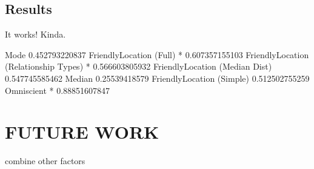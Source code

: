 \documentclass{sig-alternate}
\begin{document}
\subsection{Results}
\begin{figure}
\centering
{}
\caption{
}
\label{fig:FinalResults}
\end{figure}

It works! Kinda.

Mode 0.452793220837
FriendlyLocation (Full) * 0.607357155103
FriendlyLocation (Relationship Types) * 0.566603805932
FriendlyLocation (Median Dist) 0.547745585462
Median 0.25539418579
FriendlyLocation (Simple) 0.512502755259
Omniscient * 0.88851607847


\section{FUTURE WORK}
combine other factors


 
\end{document}
